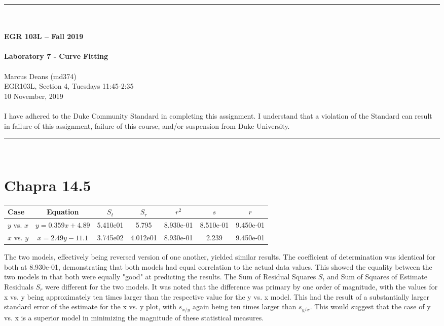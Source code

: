 \documentclass{article}
\begin{document}
\begin{center}
\rule{6.5in}{0.5mm}\\~\\
\textbf{\large EGR 103L -- Fall 2019}\\~\\
\textbf{\huge Laboratory 7 - Curve Fitting}\\~\\
Marcus Deans (md374)\\
EGR103L, Section 4, Tuesdays 11:45-2:35\\
10 November, 2019\\~\\
{\small I have adhered to the Duke Community Standard in completing
  this assignment.  I understand that a violation of the Standard can
  result in failure of this assignment, failure of this course, and/or
  suspension from Duke University.} 
\rule{6.5in}{0.5mm}\\
\end{center}
\tableofcontents
\listoffigures
\renewcommand{\arraystretch}{1.5}
\clearpage

\section{Chapra 14.5}
\begin{center}
\begin{tabular}{l|c|c|c|c|c|c}
Case & Equation & $S_t$ & $S_r$ & $r^2$ & $s$ & $r$ \\ \hline
$y$ vs. $x$ & $y=0.359x + 4.89$ & 5.410e01 & 5.795 & 8.930e-01 & 8.510e-01 & 9.450e-01\\ 
$x$ vs. $y$ & $x=2.49y -11.1$ & 3.745e02 & 4.012e01 & 8.930e-01 & 2.239 & 9.450e-01
\end{tabular}
\end{center}
The two models, effectively being reversed version of one another, yielded similar results. The coefficient of determination was identical for both at 8.930e-01, demonstrating that both models had equal correlation to the actual data values. This showed the equality between the two models in that both were equally "good" at predicting the results. The Sum of Residual Squares $S_t$ and Sum of Squares of Estimate Residuals $S_r$ were different for the two models. It was noted that the difference was primary by one order of magnitude, with the values for x vs. y being approximately ten times larger than the respective value for the y vs. x model. This had the result of a substantially larger standard error of the estimate for the x vs. y plot, with $s_{x/y}$ again being ten times larger than $s_{y/x}$. This would suggest that the case of y vs. x is a superior model in minimizing the magnitude of these statistical measures. 
\end{document}
